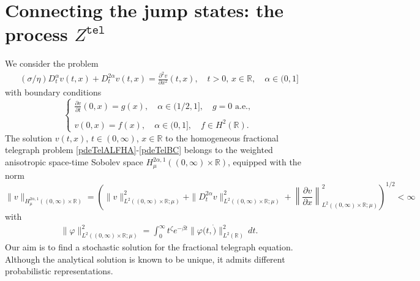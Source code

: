 \documentclass[10pt,a4paper]{article}
\numberwithin{equation}{section}
\theoremstyle{plain}
\theoremstyle{remark}
\begin{document}
\section{Connecting the jump states: the process $Z^\mathtt{tel}$}
\label{sec:Ztel}
We consider the problem
\begin{align}
(\sigma/\eta) D^\alpha_t v(t,x)  + D^{2\alpha}_t v(t,x) = \frac{\partial^2 v}{\partial x^2} (t,x), \quad t>0,\, x \in \mathbb{R}, \quad \alpha \in (0,1]
\label{pdeTelALFHA}
\end{align}
with boundary conditions
\begin{equation}
\left\lbrace
\begin{array}{ll}
\displaystyle \frac{\partial v}{\partial t}(0, x)=g(x), \quad \alpha \in (1/2, 1], \quad g=0 \textrm{ a.e.}, \\
\\
\displaystyle v(0,x)=f(x), \quad \alpha \in (0,1], \quad f \in H^2(\mathbb{R}). 
\end{array}
\right.
\label{pdeTelBC}
\end{equation}
The solution $v(t, x)$, $t \in (0, \infty)$, $x \in \mathbb{R}$ to the homogeneous fractional telegraph problem \eqref{pdeTelALFHA}-\eqref{pdeTelBC} belongs to the weighted anisotropic space-time Sobolev space $H^{2\alpha, 1}_\mu((0, \infty) \times \mathbb{R})$, equipped with the norm
\begin{equation}
\|v\|_{H^{2\alpha, 1}_\mu((0, \infty) \times \mathbb{R})} = \left( \|v\|^2_{L^2((0, \infty) \times \mathbb{R}; \mu)} + \|D^{2\alpha}_t v\|^2_{L^2((0, \infty) \times \mathbb{R}; \mu)} + \left\|\frac{\partial v}{\partial x}\right\|^2_{L^2((0, \infty) \times \mathbb{R}; \mu)} \right)^{1/2} < \infty
\end{equation}
with 
\begin{align*}
\| \varphi \|^2_{L^2((0, \infty)\times \mathbb{R}; \mu)} = \int_0^\infty   t^\zeta e^{-\beta t} \| \varphi(t, \dot) \|^2_{L^2(\mathbb{R})} \, dt.
\end{align*}
Our aim is to find a stochastic solution for the fractional telegraph equation. Although the analytical solution is known to be unique, it admits different probabilistic representations.\\
\end{document}
